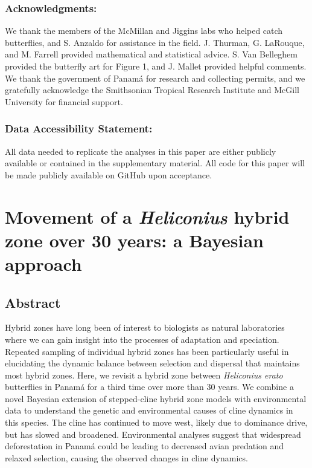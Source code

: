 \documentclass[]{article}
\begin{document}
\subsubsection{Acknowledgments:}\label{acknowledgments}

We thank the members of the McMillan and Jiggins labs who helped catch
butterflies, and S. Anzaldo for assistance in the field. J. Thurman, G.
LaRouque, and M. Farrell provided mathematical and statistical advice.
S. Van Belleghem provided the butterfly art for Figure 1, and J. Mallet
provided helpful comments. We thank the government of Panamá for
research and collecting permits, and we gratefully acknowledge the
Smithsonian Tropical Research Institute and McGill University for
financial support.

\subsubsection{Data Accessibility
Statement:}\label{data-accessibility-statement}

All data needed to replicate the analyses in this paper are either
publicly available or contained in the supplementary material. All code
for this paper will be made publicly available on GitHub upon
acceptance.

\pagebreak
{}

\linenumbers

\section{\texorpdfstring{Movement of a \textit{Heliconius} hybrid zone
over 30 years: a Bayesian
approach}{Movement of a  hybrid zone over 30 years: a Bayesian approach}}\label{movement-of-a-hybrid-zone-over-30-years-a-bayesian-approach-1}

\subsection{Abstract}\label{abstract}

Hybrid zones have long been of interest to biologists as natural
laboratories where we can gain insight into the processes of adaptation
and speciation. Repeated sampling of individual hybrid zones has been
particularly useful in elucidating the dynamic balance between selection
and dispersal that maintains most hybrid zones. Here, we revisit a
hybrid zone between \textit{Heliconius erato} butterflies in Panamá for
a third time over more than 30 years. We combine a novel Bayesian
extension of stepped-cline hybrid zone models with environmental data to
understand the genetic and environmental causes of cline dynamics in
this species. The cline has continued to move west, likely due to
dominance drive, but has slowed and broadened. Environmental analyses
suggest that widespread deforestation in Panamá could be leading to
decreased avian predation and relaxed selection, causing the observed
changes in cline dynamics.
\end{document}
